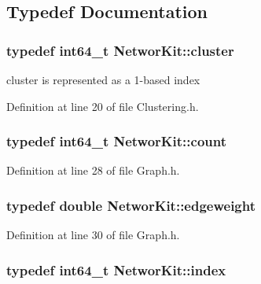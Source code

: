 \subsection{Typedef Documentation}
\hypertarget{namespace_networ_kit_aee72806475c8d37642866ab18aceab8b}{
\subsubsection[{cluster}]{\setlength{\rightskip}{0pt plus 5cm}typedef int64\-\_\-t {\bf Networ\-Kit\-::cluster}}}\label{namespace_networ_kit_aee72806475c8d37642866ab18aceab8b}


cluster is represented as a 1-\/based index 



Definition at line 20 of file Clustering.\-h.

\hypertarget{namespace_networ_kit_ad4c536a5339a8bf2f91f418b9a67a7d8}{
\subsubsection[{count}]{\setlength{\rightskip}{0pt plus 5cm}typedef int64\-\_\-t {\bf Networ\-Kit\-::count}}}\label{namespace_networ_kit_ad4c536a5339a8bf2f91f418b9a67a7d8}


Definition at line 28 of file Graph.\-h.

\hypertarget{namespace_networ_kit_a831b108dbcd79dad062d9e28b1b4e3dd}{
\subsubsection[{edgeweight}]{\setlength{\rightskip}{0pt plus 5cm}typedef double {\bf Networ\-Kit\-::edgeweight}}}\label{namespace_networ_kit_a831b108dbcd79dad062d9e28b1b4e3dd}


Definition at line 30 of file Graph.\-h.

\hypertarget{namespace_networ_kit_af49e67df68af41dcd75dffbb1e9abee6}{
\subsubsection[{index}]{\setlength{\rightskip}{0pt plus 5cm}typedef int64\-\_\-t {\bf Networ\-Kit\-::index}}}\label{namespace_networ_kit_af49e67df68af41dcd75dffbb1e9abee6}


